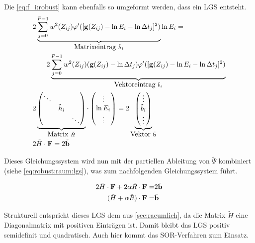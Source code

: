 Die \autoref{eq:f_i:robust} kann ebenfalls so umgeformt werden, dass ein LGS entsteht. 
\begin{align}
    & 2 \underbrace{
        \sum_{j=0}^{P-1} 
            w^2(Z_{ij})
            \varphi'(
                [\mathbf g(Z_{ij})-\ln E_i - \ln \Delta t_j]^2
            )
    }_{\mbox{Matrixeintrag }\tilde h_i}
    \ln E_i = \nonumber \\
    &\qquad 2 \underbrace{
        \sum_{j=0}^{P-1} 
            w^2(Z_{ij})
            (\mathbf g(Z_{ij})-\ln \Delta t_j)
            \varphi'(
                [\mathbf g(Z_{ij})-\ln E_i - \ln \Delta t_j]^2
            )
    }_{\mbox{Vektoreintrag } \tilde b_i}\\
    &
    2 \underbrace{
        \begin{pmatrix}
            \ddots & &\\
            & \tilde h_i & \\
            & & \ddots
        \end{pmatrix}
    }_{\mbox{Matrix }\tilde H}
    \cdot
    \begin{pmatrix}
        \vdots\\ \ln E_i \\ \vdots
    \end{pmatrix}
    =
    2 \underbrace{
        \begin{pmatrix}
            \vdots\\ \tilde b_i \\ \vdots    
        \end{pmatrix}
    }_{\mbox{Vektor }\tilde{\mathbf b}}\\
    & 2 \tilde H \cdot \mathbf F = 2 \tilde{\mathbf{b}}
\end{align}

Dieses Gleichungssystem wird nun mit der partiellen Ableitung von $\tilde \Psi$ kombiniert (siehe \autoref{eq:robust:raum:lgs}), was zum nachfolgenden Gleichungssystem führt.

\begin{align}
2 \tilde H \cdot \mathbf F + 2 \alpha \tilde R\cdot \mathbf F =& 2 \tilde{\mathbf b} \\
(\tilde H+\alpha \tilde R)\cdot \mathbf F =& \tilde{\mathbf b}
\end{align}

Strukturell entspricht dieses LGS dem aus \autoref{sec:raeumlich}, da die Matrix $\tilde H$ eine Diagonalmatrix mit positiven Einträgen ist. Damit bleibt das LGS positiv semidefinit und quadratisch. Auch hier kommt das \gls{SOR}-Verfahren zum Einsatz.




